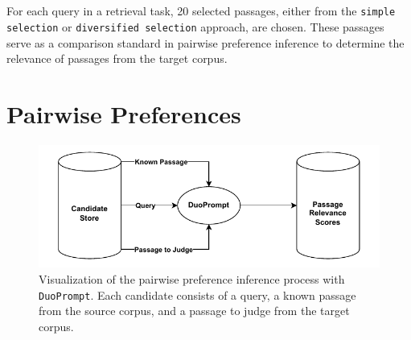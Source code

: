 \\\\
For each query in a retrieval task, 20 selected passages, either from the \texttt{simple selection} or \texttt{diversified selection} approach, are chosen. These passages serve as a comparison standard in pairwise preference inference to determine the relevance of passages from the target corpus.
\pagebreak

\section{Pairwise Preferences}\label{pairwise-preferences}

\begin{figure}[t]
    \centering
    \includegraphics[width=\textwidth]{./graphics/drawio/pairwise_preferences.pdf}
    \caption{Visualization of the pairwise preference inference process with \texttt{DuoPrompt}. Each candidate consists of a query, a known passage from the source corpus, and a passage to judge from the target corpus.}
    \label{fig:pairwise-preferences}
\end{figure}

